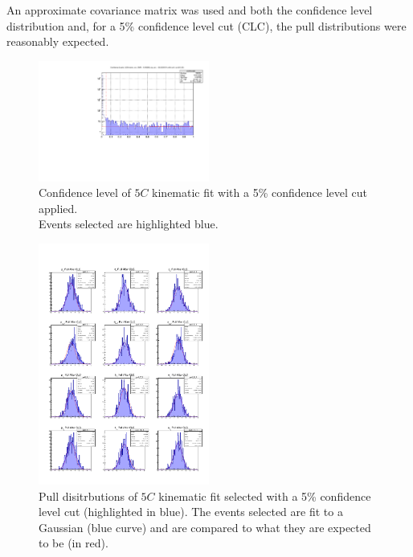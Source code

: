 \documentclass[10pt,prd,aps,showpacs,twocolumn,unsortedaddress]{revtex4-1}
\begin{document}
An approximate covariance matrix was used and both the confidence level distribution and, for a 5\% confidence level cut (CLC), the pull distributions were reasonably expected.
\begin{figure}[h!]
    \includegraphics[width = 0.5\textwidth]{figs/coh_pi0/confLevels.pdf}
    \caption{Confidence level of $5C$ kinematic fit with a 5\% confidence level cut applied. \\Events selected are highlighted blue. }
    \label{cl}
\end{figure}
\begin{figure}
    \includegraphics[width = 0.5\textwidth]{figs/coh_pi0/pulls.pdf}
    \caption{Pull disitrbutions of $5C$ kinematic fit selected with a 5\% confidence level cut (highlighted in blue). The events selected are fit to a Gaussian (blue curve) and are compared to what they are expected to be (in red). \label{pulls}}
\end{figure}

\end{document}

